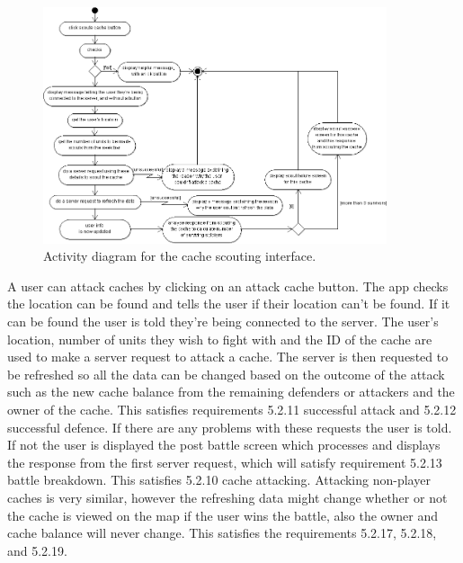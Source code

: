 \newpage
\begin{figure}
    \centering
    \includegraphics[width=0.9\textwidth]{images/activity/scout-cache}
    \caption{Activity diagram for the cache scouting interface.}
\end{figure}

A user can attack caches by clicking on an attack cache button. The app checks the location can be found and tells the user if their location can't be found. If it can be found the user is told they're being connected to the server. The user's location, number of units they wish to fight with and the ID of the cache are used to make a server request to attack a cache. The server is then requested to be refreshed so all the data can be changed based on the outcome of the attack such as the new cache balance from the remaining defenders or attackers and the owner of the cache. This satisfies requirements 5.2.11 successful attack and 5.2.12 successful defence. If there are any problems with these requests the user is told. If not the user is displayed the post battle screen which processes and displays the response from the first server request, which will satisfy requirement 5.2.13 battle breakdown. This satisfies 5.2.10 cache attacking. Attacking non-player caches is very similar, however the refreshing data might change whether or not the cache is viewed on the map if the user wins the battle, also the owner and cache balance will never change. This satisfies the requirements 5.2.17, 5.2.18, and 5.2.19.

